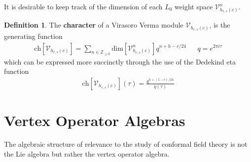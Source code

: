\documentclass[a4paper,reqno,12pt]{report}
\theoremstyle{definition}
\newtheorem{defn}{Definition}[section]
\newcommand{\Z}{\mathbb{Z}}
\numberwithin{equation}{section}
\renewcommand{\ge}{\geqslant}
\theoremstyle{plain}
\begin{document}


It is desirable to keep track of the dimension of each $L_0$ weight space $\mathcal{V}_{h_{r,s}(c)}^n$.

\begin{defn}
The {\bf character} of a Virasoro Verma module $\mathcal{V}_{h_{r,s}(c)}$, is the generating function
\begin{align*}
\text{ch}[\mathcal{V}_{h_{r,s}(c)}] = \sum_{n\in\Z_{\ge 0}} \text{dim}[\mathcal{V}_{h_{r,s}(c)}^n] q^{n+h-c/24}&&q=e^{2\pi i \tau}
\end{align*}
which can be expressed more succinctly through the use of the Dedekind eta function
\begin{align*}
\text{ch}[\mathcal{V}_{h_{r,s}(c)}](\tau) =\frac{q^{h+(1-c)/24}}{\eta(\tau)} 
\end{align*}
\end{defn}



\section{Vertex Operator Algebras}

The algebraic structure of relevance to the study of conformal field theory is not the Lie algebra but rather the vertex operator algebra.
\end{document}
